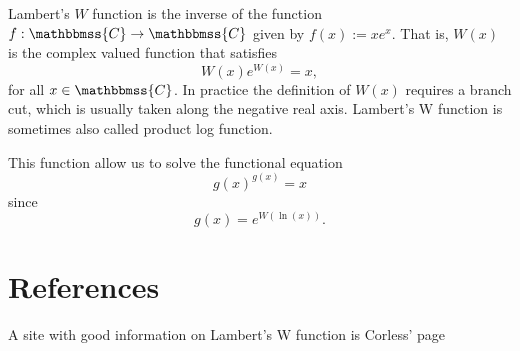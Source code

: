 \documentclass[12pt]{article}
\newcommand{\C}{\mathbbmss{C}}
\newcommand{\mathbb}[1]{\mathbbmss{#1}}
\begin{document}
Lambert's $W$ function is the inverse of the function $f: \C \to \C$ given by $f(x) := x e^x$. That is, $W(x)$ is the complex valued function that satisfies
\begin{displaymath}W(x) e^{W(x)} = x,\end{displaymath} 
for all $x \in \mathbb{C}$. In practice the definition of $W(x)$ requires a branch cut, which is usually taken along the negative real axis. Lambert's W function is sometimes also called product log function.

This function allow us to solve the functional equation $$g(x)^{g(x)}=x$$
since $$g(x)=e^{W(\ln(x))}.$$

\section{References}
A site with good information on Lambert's W function is Corless' page 
\end{document}
